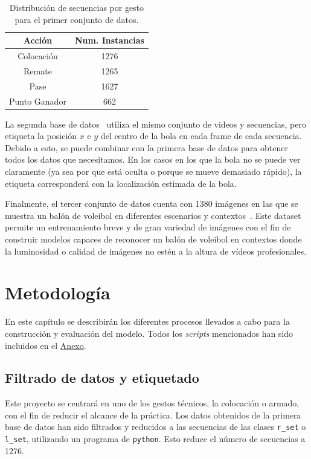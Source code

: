 \documentclass[12pt]{report} %
\begin{document}
    \begin{table}[H]
        \begin{tabular}{@{}cc@{}}
            \toprule
            Acción & Num. Instancias\\
            \midrule
            Colocación    & 1276\\
            Remate        & 1265\\
            Pase          & 1627\\
            Punto Ganador &  662\\
            \bottomrule
        \end{tabular}
        \caption{Distribución de secuencias por gesto para el primer conjunto de datos.}
    \end{table}

    La segunda base de datos~\cite{dataset2} utiliza el mismo conjunto de videos y secuencias,
    pero etiqueta la posición $x$ e $y$ del centro de la bola en cada frame de
    cada secuencia. Debido a esto, se puede combinar con la primera base de
    datos para obtener todos los datos que necesitamos. En los casos en los que
    la bola no se puede ver claramente (ya sea por que está oculta o porque se
    mueve demasiado rápido), la etiqueta corresponderá con la localización
    estimada de la bola.

    Finalmente, el tercer conjunto de datos cuenta con 1380 imágenes en las que
    se muestra un balón de voleibol en diferentes escenarios y
    contextos~\cite{dataset3}. Este dataset permite un entrenamiento breve y de
    gran variedad de imágenes con el fin de construir modelos capaces de
    reconocer un balón de voleibol en contextos donde la luminosidad o calidad
    de imágenes no estén a la altura de vídeos profesionales.

    \chapter{Metodología}
    \label{chap:metodologia}
    En este capítulo se describirán los diferentes procesos llevados a cabo para la construcción y evaluación del modelo. Todos los \textit{scripts} mencionados han sido incluidos en el \hyperref[anexo]{Anexo}.

    \section{Filtrado de datos y etiquetado}

    Este proyecto se centrará en uno de los gestos técnicos, la colocación o
    armado, con el fin de reducir el alcance de la práctica. Los datos obtenidos
    de la primera base de datos han sido filtrados y reducidos a las secuencias
    de las clases \verb!r_set! o \verb!l_set!, utilizando un programa de
    \verb!python!. Esto reduce el número de
    secuencias a 1276.
\end{document}
